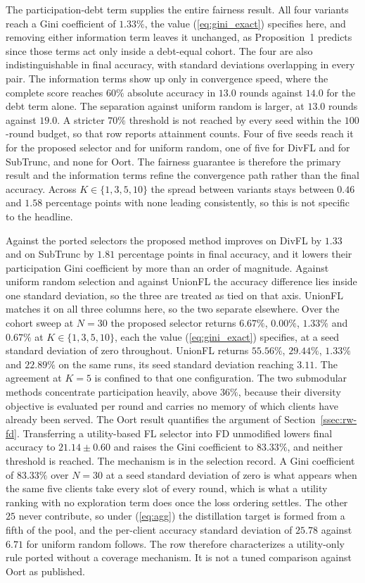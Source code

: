 \documentclass[journal]{IEEEtran}
\newcommand{\rev}[1]{{\color{blue}#1}}
\begin{document}
\rev{The participation-debt term supplies the entire fairness result. All four variants reach a Gini coefficient of $1.33\%$, the value (\ref{eq:gini_exact}) specifies here, and removing either information term leaves it unchanged, as Proposition~1 predicts since those terms act only inside a debt-equal cohort. The four are also indistinguishable in final accuracy, with standard deviations overlapping in every pair. The information terms show up only in convergence speed, where the complete score reaches $60\%$ absolute accuracy in $13.0$ rounds against $14.0$ for the debt term alone. The separation against uniform random is larger, at $13.0$ rounds against $19.0$. A stricter $70\%$ threshold is not reached by every seed within the $100$-round budget, so that row reports attainment counts. Four of five seeds reach it for the proposed selector and for uniform random, one of five for DivFL and for SubTrunc, and none for Oort. The fairness guarantee is therefore the primary result and the information terms refine the convergence path rather than the final accuracy. Across $K \in \{1, 3, 5, 10\}$ the spread between variants stays between $0.46$ and $1.58$ percentage points with none leading consistently, so this is not specific to the headline.}

\rev{Against the ported selectors the proposed method improves on DivFL by $1.33$ and on SubTrunc by $1.81$ percentage points in final accuracy, and it lowers their participation Gini coefficient by more than an order of magnitude. Against uniform random selection and against UnionFL the accuracy difference lies inside one standard deviation, so the three are treated as tied on that axis. UnionFL matches it on all three columns here, so the two separate elsewhere. Over the cohort sweep at $N=30$ the proposed selector returns $6.67\%$, $0.00\%$, $1.33\%$ and $0.67\%$ at $K \in \{1,3,5,10\}$, each the value (\ref{eq:gini_exact}) specifies, at a seed standard deviation of zero throughout. UnionFL returns $55.56\%$, $29.44\%$, $1.33\%$ and $22.89\%$ on the same runs, its seed standard deviation reaching $3.11$. The agreement at $K=5$ is confined to that one configuration. The two submodular methods concentrate participation heavily, above $36\%$, because their diversity objective is evaluated per round and carries no memory of which clients have already been served. The Oort result quantifies the argument of Section~\ref{ssec:rw-fd}. Transferring a utility-based FL selector into FD unmodified lowers final accuracy to $21.14 \pm 0.60$ and raises the Gini coefficient to $83.33\%$, and neither threshold is reached. The mechanism is in the selection record. A Gini coefficient of $83.33\%$ over $N=30$ at a seed standard deviation of zero is what appears when the same five clients take every slot of every round, which is what a utility ranking with no exploration term does once the loss ordering settles. The other $25$ never contribute, so under (\ref{eq:agg}) the distillation target is formed from a fifth of the pool, and the per-client accuracy standard deviation of $25.78$ against $6.71$ for uniform random follows. The row therefore characterizes a utility-only rule ported without a coverage mechanism. It is not a tuned comparison against Oort as published.}
\end{document}
